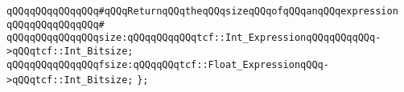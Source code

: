 \newline
\newline
\verb|qQQqqQQqqQQqqQQq#qQQqReturnqQQqtheqQQqsizeqQQqofqQQqanqQQqexpression|\newline
\verb|qQQqqQQqqQQqqQQq#|\newline
\verb|qQQqqQQqqQQqqQQqsize:qQQqqQQqqQQqtcf::Int_ExpressionqQQqqQQqqQQq->qQQqtcf::Int_Bitsize;|\newline
\verb|qQQqqQQqqQQqqQQqfsize:qQQqqQQqtcf::Float_ExpressionqQQq->qQQqtcf::Int_Bitsize;|\newline
\verb|};|\newline

